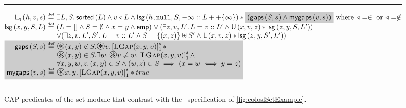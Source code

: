 %
\begin{figure}
\hrule
\[
\begin{array}{@{} l @{}}
	\begin{array}{@{} r @{\hspace*{3pt}} l @{}}
%	
		
		\sortedListCAP{\triangleleft}{h}{v}{s} \eqdef & \exsts{L, S} \sorted{L} \land v  \triangleleft L \land \lsgCAP{h}{\nil}{S}{-\infty:: L ++ \{\infty\} } * \shade{\left( \gapsCAP{S}{s} \land \myGapsCAP{v}{s} \right) } \text{ where } \triangleleft = \in \text{ or } \triangleleft = \not\in \\
	  
	
		\lsg{x}{y}{S}{L} \eqdef & (L = [] \land S = \emptyset \land x = y \land \emp) \lor (\exsts{z, v, L'} L = v::L' \land \unlockedNode{x}{v}{z} * \lsg{z}{y}{S}{L'})\\
		
		& \lor (\exsts{z, v, L', S'} L = v::L' \land S = \{(x, z)\} \uplus S' \land \lockedNode{x}{v}{z} * \lsg{z}{y}{S'}{L'})
		
	\end{array}\\
	
%		
		
		
	\shade{
	\begin{array}{@{} r @{\hspace*{3pt}} l @{}}
		\gapsCAP{S}{s} \eqdef & \iterStar(x, y) \not\in S. \iterStar v. \capGapC{x}{y}{v}{s} *\\
		& \iterStar (x, y) \in S. \exsts{w} \iterStar v \not= w. \capGapC{x}{y}{v}{s} \land \\
		&\for{x, y, w, z} (x, y) \in S \land (w, z) \in S \implies (x = w \iff y = z) \\
		
	  \myGapsCAP{v}{s} \eqdef & \iterStar x, y. \capGapC{x}{y}{v}{s} * true \\
		
	\end{array}
	}
\end{array}
\]
\hrule
\caption{CAP predicates of the set module that contrast with the \colosl\ specification of \fig\ref{fig:coloslSetExample}.}
\label{fig:capSetExample}
\end{figure}
